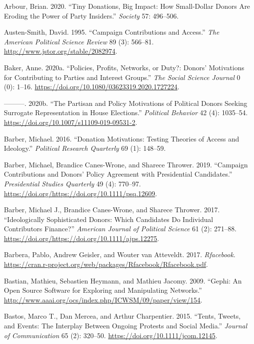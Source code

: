 \documentclass[12pt,]{article}
\begin{document}
\leavevmode\hypertarget{ref-arbour2020}{}%
Arbour, Brian. 2020. ``Tiny Donations, Big Impact: How Small-Dollar
Donors Are Eroding the Power of Party Insiders.'' \emph{Society} 57:
496--506.

\leavevmode\hypertarget{ref-austensmith1995}{}%
Austen-Smith, David. 1995. ``Campaign Contributions and Access.''
\emph{The American Political Science Review} 89 (3): 566--81.
\url{http://www.jstor.org/stable/2082974}.

\leavevmode\hypertarget{ref-baker2020a}{}%
Baker, Anne. 2020a. ``Policies, Profits, Networks, or Duty?: Donors'
Motivations for Contributing to Parties and Interest Groups.'' \emph{The
Social Science Journal} 0 (0): 1--16.
\url{https://doi.org/10.1080/03623319.2020.1727224}.

\leavevmode\hypertarget{ref-baker2020b}{}%
---------. 2020b. ``The Partisan and Policy Motivations of Political
Donors Seeking Surrogate Representation in House Elections.''
\emph{Political Behavior} 42 (4): 1035--54.
\url{https://doi.org/10.1007/s11109-019-09531-2}.

\leavevmode\hypertarget{ref-barber2016a}{}%
Barber, Michael. 2016. ``Donation Motivations: Testing Theories of
Access and Ideology.'' \emph{Political Research Quarterly} 69 (1):
148--59.

\leavevmode\hypertarget{ref-barber2019}{}%
Barber, Michael, Brandice Canes-Wrone, and Sharece Thrower. 2019.
``Campaign Contributions and Donors' Policy Agreement with Presidential
Candidates.'' \emph{Presidential Studies Quarterly} 49 (4): 770--97.
\url{https://doi.org/https://doi.org/10.1111/psq.12609}.

\leavevmode\hypertarget{ref-barber2017}{}%
Barber, Michael J., Brandice Canes-Wrone, and Sharece Thrower. 2017.
``Ideologically Sophisticated Donors: Which Candidates Do Individual
Contributors Finance?'' \emph{American Journal of Political Science} 61
(2): 271--88. \url{https://doi.org/https://doi.org/10.1111/ajps.12275}.

\leavevmode\hypertarget{ref-rfacebook}{}%
Barbera, Pablo, Andrew Geisler, and Wouter van Atteveldt. 2017.
\emph{Rfacebook}.
\url{https://cran.r-project.org/web/packages/Rfacebook/Rfacebook.pdf}.

\leavevmode\hypertarget{ref-gephi}{}%
Bastian, Mathieu, Sebastien Heymann, and Mathieu Jacomy. 2009. ``Gephi:
An Open Source Software for Exploring and Manipulating Networks.''
\url{http://www.aaai.org/ocs/index.php/ICWSM/09/paper/view/154}.

\leavevmode\hypertarget{ref-bastos2015}{}%
Bastos, Marco T., Dan Mercea, and Arthur Charpentier. 2015. ``Tents,
Tweets, and Events: The Interplay Between Ongoing Protests and Social
Media.'' \emph{Journal of Communication} 65 (2): 320--50.
\url{https://doi.org/10.1111/jcom.12145}.
\end{document}
